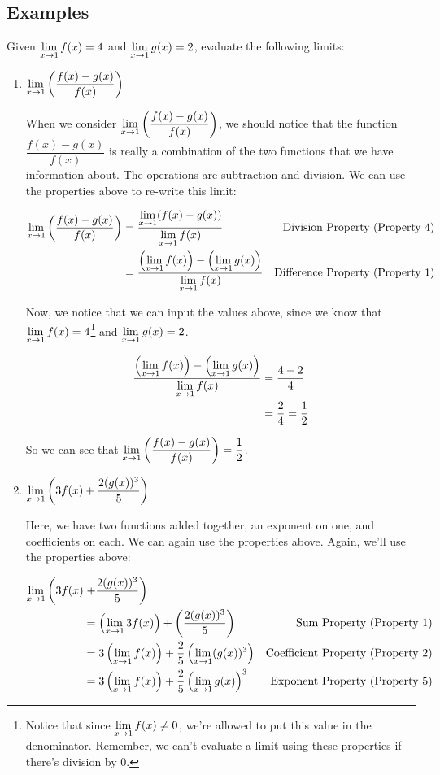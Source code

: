 \subsection*{Examples}
Given $\displaystyle \lim_{x\to 1} f(x) = 4$ and $\displaystyle \lim_{x\to 1} g(x) = 2$, evaluate the following limits:
\begin{enumerate}
  \item $\displaystyle \lim_{x\to 1}\left(\dfrac{f(x)-g(x)}{f(x)}\right)$

  When we consider $\displaystyle \lim_{x\to 1}\left(\dfrac{f(x)-g(x)}{f(x)}\right)$, we should notice that the function $\dfrac{f(x)-g(x)}{f(x)}$ is really a combination of the two functions that we have information about.
  The operations are subtraction and division.
  We can use the properties above to re-write this limit:

  \begin{align*}
    \lim_{x\to 1}\left(\dfrac{f(x)-g(x)}{f(x)}\right) &= \frac{\displaystyle \lim_{x\to 1} (f(x)-g(x))}{\displaystyle \lim_{x\to 1} f(x)} & \text{Division Property (Property 4)}\\
    & = \frac{\left(\displaystyle \lim_{x\to 1} f(x)\right)- \left(\displaystyle \lim_{x\to 1} g(x)\right)}{\displaystyle \lim_{x\to 1} f(x)} & \text{Difference Property (Property 1)}
  \end{align*}

  Now, we notice that we can input the values above, since we know that $\displaystyle \lim_{x\to1} f(x) = 4$\footnote{Notice that since $\displaystyle \lim_{x\to1}f(x)\neq0$, we're allowed to put this value in the denominator. Remember, we can't evaluate a limit using these properties if there's division by 0.} and $\displaystyle \lim_{x\to 1}g(x) = 2$.

  \begin{align*}
    \frac{\left(\displaystyle \lim_{x\to 1} f(x)\right)- \left(\displaystyle \lim_{x\to 1} g(x)\right)}{\displaystyle \lim_{x\to 1} f(x)} & = \frac{4-2}{4}\\
    &= \frac{2}{4} = \frac12
  \end{align*}

  So we can see that $\displaystyle \lim_{x\to 1}\left(\dfrac{f(x)-g(x)}{f(x)}\right) = \frac{1}{2}$.

  \item $\displaystyle \lim_{x\to 1} \left(3f(x)+\dfrac{2(g(x))^3}{5}\right)$

  Here, we have two functions added together, an exponent on one, and coefficients on each. We can again use the properties above.
  Again, we'll use the properties above:

  \begin{align*}
    \displaystyle \lim_{x\to 1} \bigg( 3f(x) &\left.+\dfrac{2(g(x))^3}{5}\right) \\
    & = \left(\displaystyle \lim_{x\to 1} 3f(x)\right) + \left(\dfrac{2(g(x))^3}{5}\right) & \text{Sum Property (Property 1)}\\
    &= 3\left(\displaystyle \lim_{x\to 1} f(x)\right) + \dfrac{2}{5}\left(\displaystyle \lim_{x\to1} (g(x))^3 \right) & \text{Coefficient Property (Property 2)}\\
    & = 3\left(\displaystyle \lim_{x\to 1} f(x)\right) + \dfrac{2}{5}\left(\displaystyle \lim_{x\to 1}g(x)\right)^3 & \text{Exponent Property (Property 5)}
  \end{align*}


\end{enumerate}
